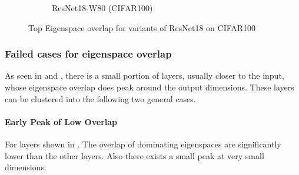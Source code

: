 \begin{figure}[H]
\begin{subfigure}[b]{\textwidth}
        \caption{ResNet18-W80 (CIFAR100)}
        \label{fig:app_adexp_cifar100_resnet80}
    \end{subfigure}
    \captionsetup{justification=centering}
    \caption{Top Eigenspace overlap for variants of ResNet18 on CIFAR100}
    \label{fig:app_adexp_resnet}
\end{figure}


\subsubsection{Failed cases for eigenspace overlap}
\label{sec:appendix-failed-exp}
As seen in  and , there is a small portion of layers, usually closer to the input, whose eigenspace overlap does peak around the output dimensions. These layers can be clustered into the following two general cases.


\paragraph{Early Peak of Low Overlap}
For layers shown in . The overlap of dominating eigenspaces are significantly lower than the other layers. Also there exists a small peak at very small dimensions.


